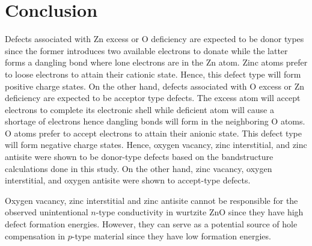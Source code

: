 \chapter{Conclusion} \label{chap:conclu}
Defects associated with Zn excess or O deficiency are expected to be donor types since the former introduces two available electrons to donate while the latter forms a dangling bond where lone electrons are in the Zn atom. Zinc atoms prefer to loose electrons to attain their cationic state. Hence, this defect type will form  positive charge states. On the other hand, defects associated with O excess or Zn deficiency are expected to be acceptor type defects. The excess  atom will accept electrons to complete its electronic shell while deficient  atom will cause a shortage of electrons hence  dangling bonds will form in the neighboring O atoms. O atoms prefer to accept electrons to attain their anionic state.
This defect type will form  negative charge states. Hence, oxygen vacancy, zinc interstitial, and zinc antisite were shown to be donor-type defects based on the bandstructure calculations done in this study. On the other hand, zinc vacancy, oxygen interstitial, and oxygen antisite were shown to accept-type defects. 

Oxygen vacancy,  zinc interstitial and zinc antisite cannot be responsible for the observed unintentional $n$-type conductivity in wurtzite ZnO since they have high defect formation energies. However, they can serve as a potential source of hole compensation in  $p$-type material since they have low formation energies. 




